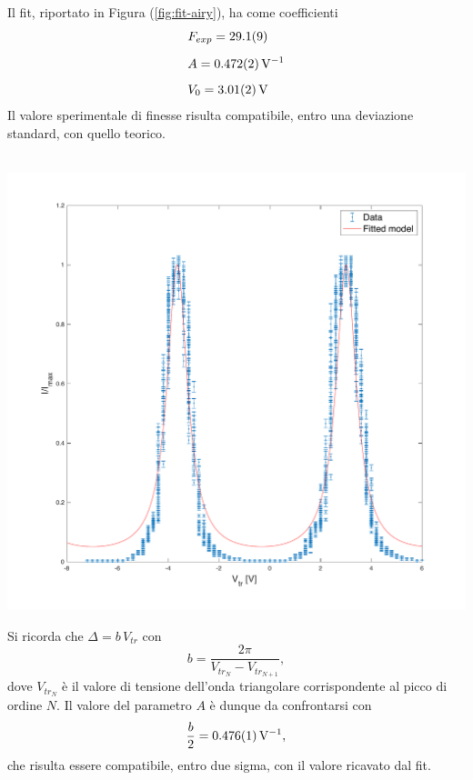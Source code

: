 \documentclass[10pt,oneside,a4paper]{article}
\newenvironment{Figure}
  {\par\medskip\noindent\minipage{\linewidth}}
  {\endminipage\par\medskip}
\begin{document}
\begin{multicols}{2}
Il fit, riportato in Figura (\ref{fig:fit-airy}), ha come coefficienti 
\begin{align*}
&F_{exp} = \SI{29.1\pm0.9}{}\\[0.2cm]
&A = \SI{0.472\pm0.002}{V^{-1}}\\[0.2cm]
&V_0 = \SI{3.01\pm0.02}{V}
\end{align*}
Il valore sperimentale di finesse risulta compatibile, entro una deviazione standard, con quello teorico. 

\begin{Figure}
	\begin{center}
	\hbox{\hspace{-0.8cm}
	\includegraphics[width=1.1\linewidth]{fit-airy}}
	\label{fig:fit-airy}
	\end{center}
\end{Figure}

Si ricorda che $\Delta = b\,V_{tr}$ con 
\[ \label{eq:b}
b = \frac{2\pi}{V_{tr_N}-V_{tr_{N+1}}},
\]
dove $V_{tr_N}$ è il valore di tensione dell'onda triangolare corrispondente al picco di ordine $N$. Il valore del parametro $A$ è dunque da confrontarsi con \[
\frac{b}{2} = \SI{0.476\pm0.001}{V^{-1}},
\]
che risulta essere compatibile, entro due sigma, con il valore ricavato dal fit.


\end{multicols}
\end{document}
